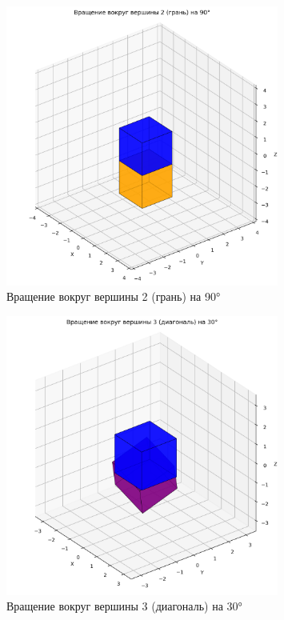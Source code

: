 \begin{figure}[H]
\centering
\includegraphics[width=0.8\textwidth]{images/task5/rotate_around_vertex_2.png}
\caption{Вращение вокруг вершины 2 (грань) на 90°}
\end{figure}

\begin{figure}[H]
\centering
\includegraphics[width=0.8\textwidth]{images/task5/rotate_around_vertex_3.png}
\caption{Вращение вокруг вершины 3 (диагональ) на 30°}
\end{figure}

